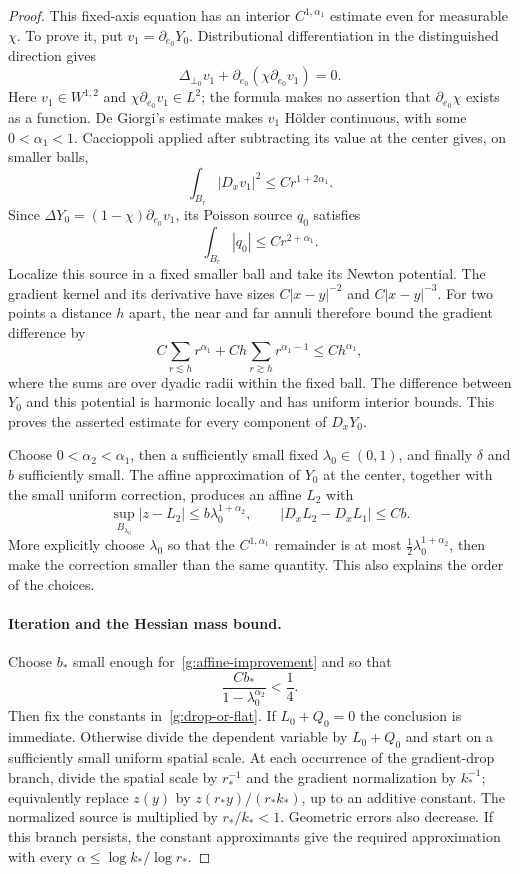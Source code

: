 \begin{proof}
This fixed-axis equation has an interior $C^{1,\alpha_1}$ estimate even
for measurable $\chi$.  To prove it, put $v_1=\partial_{e_0}Y_0$.
Distributional differentiation in the distinguished direction gives
\begin{equation}\label{g:directional-divergence}
 \Delta_{\perp_0}v_1+
               \partial_{e_0}(\chi\partial_{e_0}v_1)=0.
\end{equation}
Here $v_1\in W^{1,2}$ and $\chi\partial_{e_0}v_1\in L^2$; the
formula makes no assertion that $\partial_{e_0}\chi$ exists as a
function.  De Giorgi's estimate makes $v_1$ H\"older continuous, with
some $0<\alpha_1<1$.  Caccioppoli applied after subtracting its value at
the center gives, on smaller balls,
\[
 \int_{B_r}|D_xv_1|^2\leq Cr^{1+2\alpha_1}.
\]
Since
$\Delta Y_0=(1-\chi)\partial_{e_0}v_1$, its Poisson source $q_0$
satisfies
\[
 \int_{B_r}|q_0|\leq Cr^{2+\alpha_1}.
\]
Localize this source in a fixed smaller ball and take its Newton
potential.  The gradient kernel and its derivative have sizes
$C|x-y|^{-2}$ and $C|x-y|^{-3}$.  For two points a distance $h$ apart,
the near and far annuli therefore bound the gradient difference by
\[
 C\sum_{r\lesssim h}r^{\alpha_1}
       +Ch\sum_{r\gtrsim h}r^{\alpha_1-1}
       \leq Ch^{\alpha_1},
\]
where the sums are over dyadic radii within the fixed ball.
The difference between $Y_0$ and this potential is harmonic locally and
has uniform interior bounds.  This proves the asserted estimate for
every component of $D_xY_0$.

Choose $0<\alpha_2<\alpha_1$, then a sufficiently small fixed
$\lambda_0\in(0,1)$, and finally $\delta$ and $b$ sufficiently small.
The affine approximation of $Y_0$ at the center, together with the small
uniform correction, produces an affine $L_2$ with
\begin{equation}\label{g:affine-improvement}
 \sup_{B_{\lambda_0}}|z-L_2|
        \leq b\lambda_0^{1+\alpha_2},\qquad
 |D_xL_2-D_xL_1|\leq Cb.
\end{equation}
More explicitly choose $\lambda_0$ so that the $C^{1,\alpha_1}$
remainder is at most
$\tfrac12\lambda_0^{1+\alpha_2}$, then make the correction smaller
than the same quantity.  This also explains the order of the choices.

\paragraph{Iteration and the Hessian mass bound.}
Choose $b_*$ small enough for~\eqref{g:affine-improvement} and so that
\[
 \frac{Cb_*}{1-\lambda_0^{\alpha_2}}<\frac14.
\]
Then fix the constants in~\eqref{g:drop-or-flat}.  If $L_0+Q_0=0$ the
conclusion is immediate.  Otherwise divide the dependent variable by
$L_0+Q_0$ and start on a sufficiently small uniform spatial scale.
At each occurrence of the gradient-drop branch, divide the spatial
scale by $r_*^{-1}$ and the gradient normalization by $k_*^{-1}$;
equivalently replace $z(y)$ by $z(r_*y)/(r_*k_*)$, up to an additive
constant.  The normalized source is multiplied by $r_*/k_*<1$.
Geometric errors also decrease.  If this branch persists, the constant
approximants give the required approximation with every
$\alpha\leq\log k_*/\log r_*$.


\end{proof}
